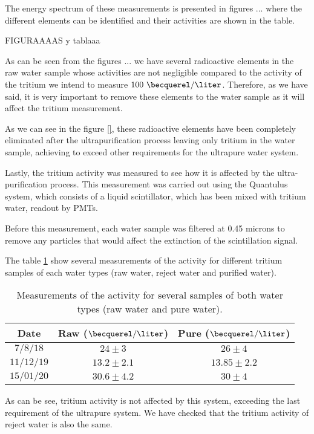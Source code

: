 The energy spectrum of these measurements is presented in figures ... where the different elements can be identified and their activities are shown in the table.

FIGURAAAAS y tablaaa

As can be seen from the figures ... we have several radioactive elements in the raw water sample whose activities are not negligible compared to the activity of the tritium we intend to measure $100~\becquerel/\liter$. Therefore, as we have said, it is very important to remove these elements to the water sample as it will affect the tritium measurement.

As we can see in the figure \ref{}, these radioactive elements have been completely eliminated after the ultrapurification process leaving only tritium in the water sample, achieving to exceed other requirements for the ultrapure water system.

Lastly, the tritium activity was measured to see how it is affected by the ultra-purification process. This measurement was carried out using the Quantulus system, which consists of a liquid scintillator, which has been mixed with tritium water, readout by PMTs. 

Before this measurement, each water sample was filtered at 0.45 microns to remove any particles that would affect the extinction of the scintillation signal.

The table \ref{tab:ActivityTritiumValues} show several measurements of the activity for different tritium samples of each water types (raw water, reject water and purified water).

\begin{table}[htbp]
\begin{center}
\begin{tabular}{|c|c|c|}
\hline
Date & Raw ($\becquerel/\liter$) & Pure ($\becquerel/\liter$) \\
\hline \hline \hline
$7/8/18$ & $24 \pm 3$ & $26 \pm 4$ \\ \hline
$11/12/19$ & $13.2 \pm 2.1$ & $13.85 \pm 2.2$ \\ \hline
$15/01/20$ & $30.6 \pm 4.2$ & $30 \pm 4$ \\ \hline
\end{tabular}
\caption{Measurements of the activity for several samples of both water types (raw water and pure water).}
\label{tab:ActivityTritiumValues}
\end{center}
\end{table}	

As can be see, tritium activity is not affected by this system, exceeding the last requirement of the ultrapure system. We have checked that the tritium activity of reject water is also the same.